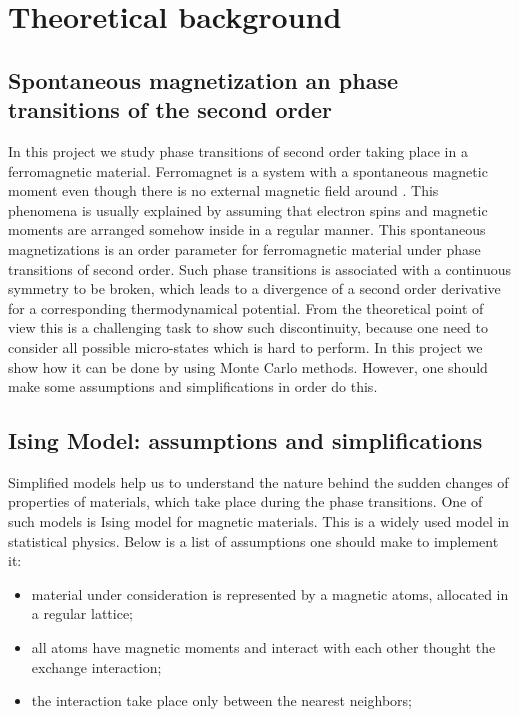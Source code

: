 \documentclass[a4paper]{article}
\begin{document}
\section{Theoretical background} \label{Theoretical background}
\subsection{Spontaneous magnetization an phase transitions of the second order}
In this project we study phase transitions of second order taking place in a ferromagnetic material. Ferromagnet is a system with a spontaneous magnetic moment even though there is no external magnetic field around \cite{three}. This phenomena is usually explained by assuming that electron spins and magnetic moments are arranged somehow inside in a regular manner. This spontaneous magnetizations is an order parameter for ferromagnetic material under phase transitions of second order. Such phase transitions is associated with a continuous symmetry to be broken, which leads to a divergence of a second order derivative for a corresponding thermodynamical potential. From the theoretical point of view this is a challenging task to show such discontinuity, because one need to consider all possible micro-states which is hard to perform. In this project we show how it can be done by using Monte Carlo methods. However, one should make some assumptions and simplifications in order do this. 
 
\subsection{Ising Model: assumptions and simplifications}
Simplified models help us to understand the nature behind the sudden changes of properties of materials, which take place during the phase transitions. One of such models is Ising model for magnetic materials.  This is a widely used model in statistical physics. Below is a list of assumptions one should make to implement it:

\begin{itemize}
\item material under consideration is represented by a magnetic atoms, allocated in a regular lattice;
\item all atoms have magnetic moments and interact with each other thought the exchange interaction;
\item the interaction take place only between the nearest neighbors;
\end{itemize}
\end{document}
